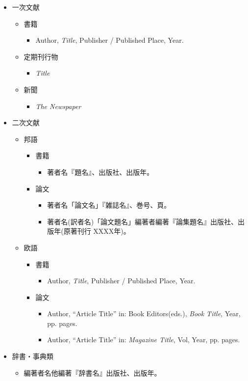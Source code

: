 \begin{itemize}
\item{一次文献}
  \begin{itemize}
    \item{書籍}
      \begin{itemize}
        \item{Author, {\it Title}, Publisher / Published Place, Year. }
      \end{itemize}
    \item{定期刊行物}
      \begin{itemize}
        \item{{\it Title}}
      \end{itemize}
    \item{新聞}
      \begin{itemize}
        \item{{\it The Newspaper}}
      \end{itemize}
  \end{itemize}

\item{二次文献}
  \begin{itemize}
    \item{邦語}
      \begin{itemize}
        \item{書籍}
          \begin{itemize}
            \item{著者名『題名』、出版社、出版年。}
          \end{itemize}
        \item{論文}
          \begin{itemize}
            \item{著者名「論文名」『雑誌名』、巻号、頁。}
            \item{著者名(訳者名)「論文題名」編著者編著『論集題名』出版社、出版年(原著刊行 XXXX年)。}
          \end{itemize}
      \end{itemize}
    \item{欧語}
      \begin{itemize}
        \item{書籍}
          \begin{itemize}
            \item{Author, {\it Title}, Publisher / Published Place, Year. }
          \end{itemize}
        \item{論文}
          \begin{itemize}
            \item{Author, “Article Title” in: Book Editors(eds.), {\it Book Title}, Year, pp. pages.}
            \item{Author, “Article Title” in: {\it Magazine Title}, Vol, Year, pp. pages.}
          \end{itemize}
        \end{itemize}
      \end{itemize}

  \item{辞書・事典類}
    \begin{itemize}
      \item{編著者名他編著『辞書名』出版社、出版年。}
    \end{itemize}
\end{itemize}

